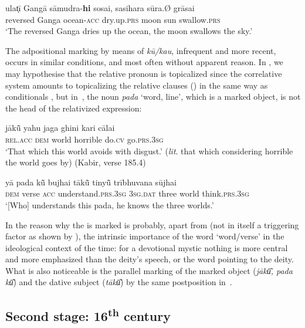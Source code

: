 \documentclass[output=paper]{LSP/langsci}
\begin{document}
\ea
\label{10-mo-ex:31}
\gll ulat̩ī Gangā sāmudra-\textbf{hi} sosai, sasihara sūra.Ø grāsai\\
 reversed Ganga ocean-\textsc{acc} dry.up.\textsc{prs} moon sun swallow.\textsc{prs}\\
\glt ‘The reversed Ganga dries up the ocean, the moon swallows the sky.’
\z

The adpositional marking by means of \textit{kū/kau}, infrequent and more recent, occurs in similar conditions, and most often without apparent reason. In , we may hypothesise that the relative pronoun is topicalized since the  correlative system amounts to topicalizing the relative clauses (\citealt{Gupta1986Discourse,Montaut2012Saillance}) in the same way as conditionals \citep{Haiman1978Conditionals}, but in~, the noun \textit{pada} ‘word, line’, which is a marked object, is not the head of the relativized expression:

\ea
\label{10-mo-ex:32}
\gll 	jākū̃ yahu jaga ghini kari cālai\\
\textsc{rel.acc} \textsc{dem} world horrible do.\textsc{cv} go.\textsc{prs.3sg}\\
\glt ‘That which this world avoids with disgust.’  (\textit{lit}. that which considering horrible the world goes by) (Kabir, verse 185.4)
\z

\ea
\label{10-mo-ex:33}
\gll  yā 		pada kū̃ 	bujhai 	tākū̃ 		tinyū̃ trībhuvana	sūjhai 	\\
\textsc{dem} verse \textsc{acc} understand.\textsc{prs.3sg} \textsc{3sg.dat} three world think.\textsc{prs.3sg}\\
\glt ‘[Who] understands this pada, he knows the three worlds.’ 
\z

In  the reason why the  is marked is probably, apart from  (not in itself a triggering factor as shown by ), the intrinsic importance of the word ‘word/verse’ in the ideological context of the time: for a devotional mystic nothing is more central and more emphasized than the deity’s speech, or the word pointing to the deity. What is also noticeable is the parallel marking of the marked object (\textit{jākū͂, pada kū͂}) and the dative subject (\textit{tākū͂}) by the same postposition in~. 

\subsection{Second stage: 16\textsuperscript{th} century}
\label{10-mo-sec:4.2}
\end{document}
